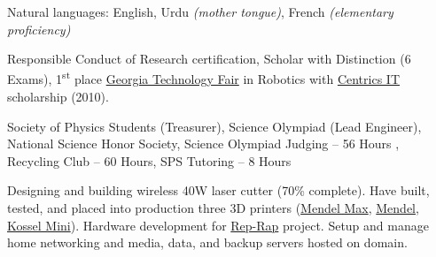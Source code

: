 \documentclass[10pt,a4paper]{article}
\begin{document}
\vspace{0.5em}
\inlineheadsection
  {Natural languages:}
  {English, Urdu \emph{(mother tongue)}, French \emph{(elementary proficiency)}}

\spacedhrule{1.6em}{-0.4em}

  {\href{https://www.citiprogram.org/}{} Responsible Conduct of Research certification,  Scholar with Distinction (6 Exams), 1\textsuperscript{st} place \href{http://www.gatechfair.org/}{Georgia Technology Fair} in Robotics with \href{http://www.centricsit.com/}{Centrics IT} scholarship (2010).}
  
\spacedhrule{0.2em}{-0.4em}
  
	{Society of Physics Students (Treasurer), Science Olympiad (Lead Engineer), National Science Honor Society, Science Olympiad Judging -- 56 Hours , Recycling Club -- 60 Hours, SPS Tutoring -- 8 Hours}

\spacedhrule{0.2em}{-0.4em}

{Designing and building wireless 40W laser cutter (70\% complete). Have built, tested, and placed into production three 3D printers (\href{http://reprap.org/wiki/MendelMax}{Mendel Max}, \href{http://reprap.org/wiki/Mendel}{Mendel}, \href{http://reprap.org/wiki/Kossel}{Kossel Mini}). Hardware development for \href{http://reprap.org/wiki/RepRap}{Rep-Rap} project. Setup and manage home networking and media, data, and backup servers hosted on domain.}
\end{document}
